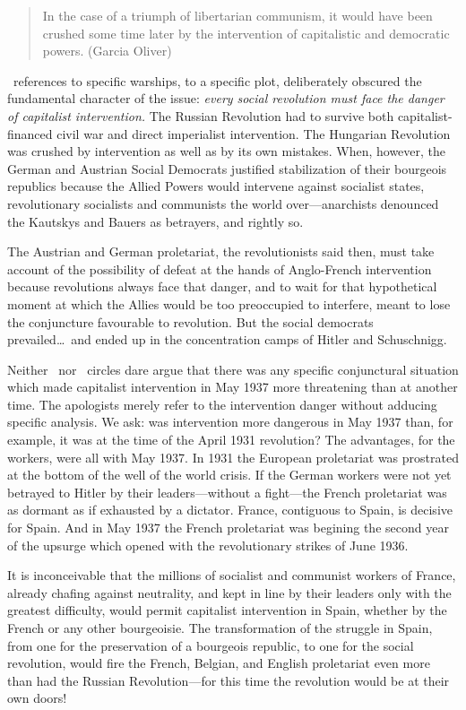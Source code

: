 \begin{quotation}
  In the case of a triumph of libertarian communism, it would have been crushed some time later by the intervention of capitalistic and democratic powers. (Garcia Oliver)
  \noclub
\end{quotation}

\CNT\ references to specific warships, to a specific plot, deliberately obscured the fundamental character of the issue: \emph{every social revolution must face the danger of capitalist intervention.} The Russian Revolution had to survive both capitalist-financed civil war and direct imperialist intervention. The Hungarian Revolution was crushed by intervention as well as by its own mistakes. When, however, the German and Austrian Social Democrats justified stabilization of their bourgeois republics because the Allied Powers would intervene against socialist states, revolutionary socialists and communists the world over---anarchists denounced the Kautskys and Bauers as betrayers, and rightly so.

The Austrian and German proletariat, the revolutionists said then, must take account of the possibility of defeat at the hands of Anglo-French intervention because revolutions always face that danger, and to wait for that hypothetical moment at which the Allies would be too preoccupied to interfere, meant to lose the conjuncture favourable to revolution. But the social democrats prevailed\dots\ and ended up in the concentration camps of Hitler and Schuschnigg.

Neither \CNT\ nor \POUM\ circles dare argue that there was any specific conjunctural situation which made capitalist intervention in May 1937 more threatening than at another time. The apologists merely refer to the intervention danger without adducing specific analysis. We ask: was intervention more dangerous in May 1937 than, for example, it was at the time of the April 1931 revolution? The advantages, for the workers, were all with May 1937. In 1931 the European proletariat was prostrated at the bottom of the well of the world crisis. If the German workers were not yet betrayed to Hitler by their leaders---without a fight---the French proletariat was as dormant as if exhausted by a dictator. France, contiguous to Spain, is decisive for Spain. And in May 1937 the French proletariat was begining the second year of the upsurge which opened with the revolutionary strikes of June 1936.

It is inconceivable that the millions of socialist and communist workers of France, already chafing against neutrality, and kept in line by their leaders only with the greatest difficulty, would permit capitalist intervention in Spain, whether by the French or any other bourgeoisie. The transformation of the struggle in Spain, from one for the preservation of a bourgeois republic, to one for the social revolution, would fire the French, Belgian, and English proletariat even more than had the Russian Revolution---for this time the revolution would be at their own doors!

